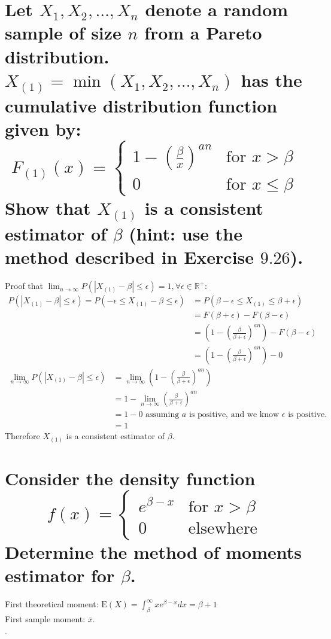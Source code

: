 \documentclass[10pt, letterpaper, titlepage]{article}
\newcommand\abs[1]{\left|#1\right|}
\newcommand{\mx}{\overline{x}}
\newcommand{\R}{\mathbb{R}}
\newcommand{\E}{\text{E}}
\begin{document}
    \newpage
    \section[]{Let $X_1 , X_2 , \hdots , X_n$ denote a random sample of size $n$ from a Pareto distribution.
        $X_{(1)} = \min(X_1 , X_2 , \hdots , X_n)$ has the cumulative distribution function given by:
        \[
            F_{(1)}(x) = 
            \begin{cases}
                1 - (\frac{\beta}{x})^{an} &\text{for } x > \beta \\
                0 &\text{for } x \leq \beta
            \end{cases}
        \]
        Show that $X_{(1)}$ is a consistent estimator of $\beta$ (hint: use the method described in Exercise $9.26$).}
        Proof that $\lim_{n \to \infty}P(\abs{X_{(1)} - \beta} \leq \epsilon) = 1, \forall \epsilon \in \R^+$:
        \begin{align*}
            P(\abs{X_{(1)} - \beta} \leq \epsilon)
            = P(-\epsilon \leq X_{(1)} - \beta \leq \epsilon)
            &= P(\beta-\epsilon \leq X_{(1)}  \leq \beta+\epsilon)\\
            &= F(\beta + \epsilon) - F(\beta - \epsilon)\\
            &= (1 - (\frac{\beta}{\beta + \epsilon})^{an}) - F(\beta - \epsilon)\\
            &= (1 - (\frac{\beta}{\beta + \epsilon})^{an}) - 0
        \end{align*}
        \begin{align*}
            \lim_{n \to \infty}P(\abs{X_{(1)} - \beta} \leq \epsilon)
            &= \lim_{n \to \infty}(1 - (\frac{\beta}{\beta + \epsilon})^{an})\\
            &= 1 - \lim_{n \to \infty}(\frac{\beta}{\beta + \epsilon})^{an}\\
            &= 1 - 0 \text{ assuming $a$ is positive, and we know $\epsilon$ is positive.}\\
            &= 1
        \end{align*}
        Therefore $X_{(1)}$ is a consistent estimator of $\beta$.

    \section[]{Consider the density function
        \[
            f(x) = 
            \begin{cases}
                e^{\beta - x} &\text{for } x > \beta\\
                0 &\text{elsewhere}
            \end{cases}
        \]
        Determine the method of moments estimator for $\beta$.}
        First theoretical moment: \(
            \E(X) = \int_\beta^\infty{xe^{\beta-x}}dx
            = \beta+1
        \)\\
        First sample moment: $\mx$.\\
        \fbox{$\hat\beta_{mm} = \mx - 1$}.
\end{document}
